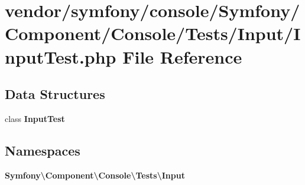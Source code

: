 \section{vendor/symfony/console/\+Symfony/\+Component/\+Console/\+Tests/\+Input/\+Input\+Test.php File Reference}
\label{_input_test_8php}
\subsection*{Data Structures}
\begin{DoxyCompactItemize}
\item 
class {\bf Input\+Test}
\end{DoxyCompactItemize}
\subsection*{Namespaces}
\begin{DoxyCompactItemize}
\item 
 {\bf Symfony\textbackslash{}\+Component\textbackslash{}\+Console\textbackslash{}\+Tests\textbackslash{}\+Input}
\end{DoxyCompactItemize}
